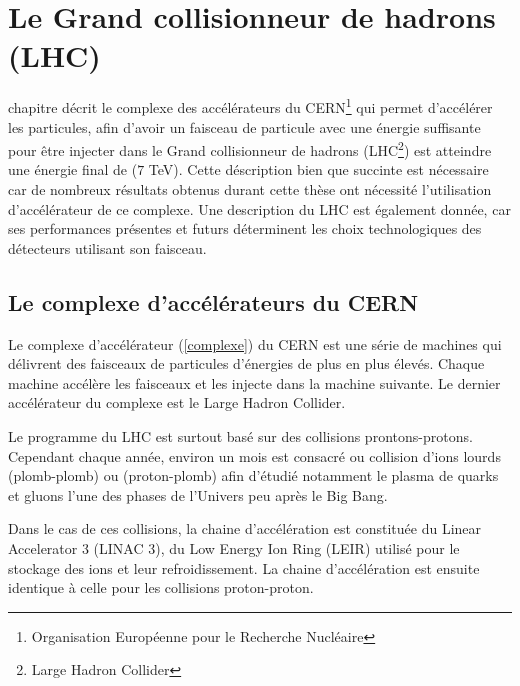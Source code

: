 \chapter{Le Grand collisionneur de hadrons (LHC)}
\renewcommand\chapterillustration{LHC/lhc}
\ThisULCornerWallPaper{1}{\chapterillustration}
\minitoc
\vspace{1cm}
 chapitre décrit le complexe des accélérateurs du CERN\footnote{Organisation Européenne pour le Recherche Nucléaire} qui permet d'accélérer les particules, afin d'avoir un faisceau de particule avec une énergie suffisante pour être injecter dans le Grand collisionneur de hadrons (LHC\footnote{Large Hadron Collider}) est atteindre une énergie final de ($7$ TeV). Cette déscription bien que succinte est nécessaire car de nombreux résultats obtenus durant cette thèse ont nécessité l'utilisation d'accélérateur de ce complexe. Une description du LHC est également donnée, car ses performances présentes et futurs déterminent les choix technologiques des détecteurs utilisant son faisceau.

\section{Le complexe d'accélérateurs du CERN}

Le complexe d'accélérateur (\ref{complexe}) du CERN est une série de machines qui délivrent des faisceaux de particules d'énergies de plus en plus élevés. Chaque machine accélère les faisceaux et les injecte dans la machine suivante. Le dernier accélérateur du complexe est le Large Hadron Collider.

Le programme du LHC est surtout basé sur des collisions prontons-protons. Cependant chaque année, environ un mois est consacré ou collision d'ions lourds (plomb-plomb) ou (proton-plomb) afin d'étudié notamment le plasma de quarks et gluons l'une des phases de l'Univers peu après le Big Bang. 

Dans le cas de ces collisions, la chaine d'accélération est constituée du Linear Accelerator 3 (LINAC 3), du Low Energy Ion Ring (LEIR) utilisé pour le stockage des ions et leur refroidissement. La chaine d'accélération est ensuite identique à celle pour les collisions proton-proton.

